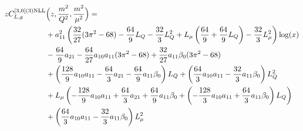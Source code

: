 \documentclass[a4paper]{article}
\begin{document}
\begin{equation}
	\begin{split}
		z C_{L,g}^{[3, 0](3) \rm NLL}&\Bigl(z,\frac{m^2}{Q^2},\frac{m^2}{\mu^2}\Bigr)= \\
		& + a_{11}^2 \left(\frac{32}{27} (3 \pi^2 - 68) - \frac{64}{9} L_Q - \frac{32}{3} L_Q^2 + L_\mu \left(\frac{64}{9} + \frac{64}{9} L_Q\right)- \frac{32}{3} L_\mu^2\right) \log(x) \\
		& -\frac{64}{9} a_{21} - \frac{64}{27} a_{10} a_{11} (3 \pi^2 - 68) +  \frac{32}{27} a_{11} \beta_0 (3 \pi^2 - 68) \\
		&  + \left(\frac{128}{9} a_{10} a_{11} - \frac{64}{3} a_{21} - \frac{64}{9} a_{11} \beta_0\right) L_Q + \left(\frac{64}{3} a_{10} a_{11} - \frac{32}{3} a_{11} \beta_0\right) L_Q^2\\
		& + L_\mu \left(-\frac{128}{9} a_{10} a_{11} + \frac{64}{3} a_{21} + \frac{64}{9} a_{11} \beta_0 +\left(- \frac{128}{3} a_{10} a_{11} + \frac{64}{3} a_{11} \beta_0 \right)L_Q\right) \\
		& + \left(\frac{64}{3} a_{10} a_{11} - \frac{32}{3} a_{11} \beta_0\right) L_\mu^2
	\end{split}
\end{equation}
\end{document}

